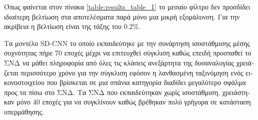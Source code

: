   

\begin{table}[H]
 \begin{adjustwidth}{-0.8cm}{}
\caption[\textgreek{Αποτελέσματα Μέσου Φίλτρου}]{\textgreek{Αποτελέσματα των ΠΣΝΔ με τον αλγόριθμο Μέσου Φίλτρου ως μονάδα μετα-επεξεργασίας χρησιμοποιώντας διαφορετικά μεγέθη παραθύρων.} SD (Strided Deconvolution) \textgreek{είναι η μονάδα με αποκωδικοποίησης με βήμα ολίσθησης ενώ }BD (Bilinear Deconvolution) \textgreek{είναι η διγραμμική μονάδα αποκωδικοποίησης. Με }MFB (Median Frequency Balance) \textgreek{συμβολίζουμε την συνάρτηση ισοστάθμισης που χρησιμοποιήσαμε.}}\label{table:results_table_1}
\end{adjustwidth}
\end{table}

\textgreek{Όπως φαίνεται στον πίνακα }\ref{table:results_table_1} \textgreek{το μεσαίο φίλτρο δεν προσδίδει ιδιαίτερη βελτίωση στα αποτελέσματα παρά μόνο μια μικρή εξομάλυνση. Για την ακρίβεια η βελτίωση είναι της τάξης του $0.2\%$. }
\par
\textgreek{Τα μοντέλο }SD-CNN \textgreek{το οποίο εκπαιδεύτηκε με την συνάρτηση ισοστάθμισης μέσης συχνότητας πήρε 70 εποχές μέχρι να επιτευχθεί σύγκλιση καθώς επειδή προσπαθεί το ΣΝΔ να μάθει πληροφορία από όλες τις κλάσεις ανεξάρτητα της δυσαναλογίας χρειάζεται περισσότερο χρόνο για την σύγκλιση εφόσον η λανθασμένη ταξινόμηση ενός εικονοστοιχείου που βρίσκεται σε μια σπάνια κατηγορία διαδίδει μεγαλύτερο σφάλμα προς τα πίσω στο ΣΝΔ. Τα ΣΝΔ που εκπαιδεύτηκαν χωρίς ισοστάθμιση, χρειάστηκαν μόνο 40 εποχές για να συγκλίνουν καθώς βρέθηκαν πολύ γρήγορα σε κατάσταση υπερμάθησης.}
\par

